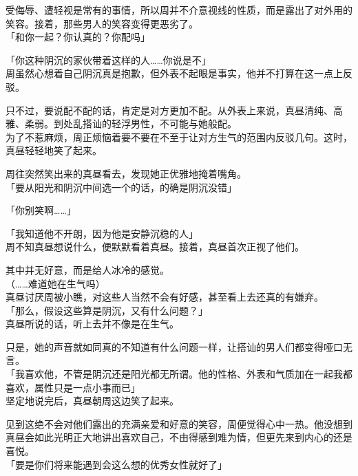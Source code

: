 受侮辱、遭轻视是常有的事情，所以周并不介意视线的性质，而是露出了对外用的笑容。接着，那些男人的笑容变得更恶劣了。\\

「和你一起？你认真的？你配吗」

「你这种阴沉的家伙带着这样的人……你说是不」\\

周虽然心想着自己阴沉真是抱歉，但外表不起眼是事实，他并不打算在这一点上反驳。

只不过，要说配不配的话，肯定是对方更加不配。从外表上来说，真昼清纯、高雅、柔弱。到处乱搭讪的轻浮男性，不可能与她般配。\\

为了不惹麻烦，周正烦恼着要不要在不至于让对方生气的范围内反驳几句。这时，真昼轻轻地笑了起来。

周往突然笑出来的真昼看去，发现她正优雅地掩着嘴角。\\

「要从阳光和阴沉中间选一个的话，的确是阴沉没错」

「你别笑啊……」

「我知道他不开朗，因为他是安静沉稳的人」\\

周不知真昼想说什么，便默默看着真昼。接着，真昼首次正视了他们。

其中并无好意，而是给人冰冷的感觉。\\

（……难道她在生气吗）\\

真昼讨厌周被小瞧，对这些人当然不会有好感，甚至看上去还真的有嫌弃。\\

「那么，假设这些算是阴沉，又有什么问题？」\\

真昼所说的话，听上去并不像是在生气。

只是，她的声音就如同真的不知道有什么问题一样，让搭讪的男人们都变得哑口无言。\\

「我喜欢他，不管是阴沉还是阳光都无所谓。他的性格、外表和气质加在一起我都喜欢，属性只是一点小事而已」\\

坚定地说完后，真昼朝周这边笑了起来。

见到这绝不会对他们露出的充满亲爱和好意的笑容，周便觉得心中一热。他没想到真昼会如此光明正大地讲出喜欢自己，不由得感到难为情，但更先来到内心的还是喜悦。\\

「要是你们将来能遇到会这么想的优秀女性就好了」\\

